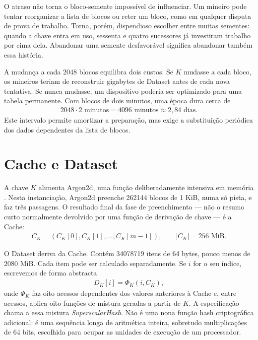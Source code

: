 O atraso não torna o bloco-semente impossível de influenciar. Um mineiro pode
tentar reorganizar a lista de blocos ou reter um bloco, como em qualquer disputa de
prova de trabalho. Torna, porém, dispendioso escolher entre muitas sementes:
quando a chave entra em uso, sessenta e quatro sucessores já investiram
trabalho por cima dela. Abandonar uma semente desfavorável significa abandonar
também essa história.

A mudança a cada 2048 blocos equilibra dois custos. Se \(K\) mudasse a cada
bloco, os mineiros teriam de reconstruir gigabytes de Dataset antes de cada
nova tentativa. Se nunca mudasse, um dispositivo poderia ser optimizado para
uma tabela permanente. Com blocos de dois minutos, uma época dura cerca de
\begin{align*}
 2048\cdot2\text{ minutos}=4096\text{ minutos}
 \approx 2{,}84\text{ dias}.
\end{align*}
Este intervalo permite amortizar a preparação, mas exige a substituição
periódica dos dados dependentes da lista de blocos.


\section{Cache e Dataset}
\label{sec:randomx-two-memories}

A chave \(K\) alimenta Argon2d, uma
função deliberadamente intensiva em memória \cite{argon2-paper}. Nesta
instanciação, Argon2d preenche 262144 blocos de 1 KiB, numa só pista, e faz
três passagens. O resultado final da fase de preenchimento --- não o resumo
curto normalmente devolvido por uma função de derivação de chave --- é a
Cache:
\begin{align}
 C_K=(C_K[0],C_K[1],\ldots,C_K[m-1]),\qquad |C_K|=256\text{ MiB}.
 \label{eq:randomx-cache}
\end{align}

O Dataset deriva da Cache. Contém 34078719 itens de 64 bytes, pouco menos
de 2080 MiB. Cada item pode ser calculado separadamente. Se \(i\) for o seu
índice, escrevemos de forma abstracta
\begin{align}
 D_K[i]=\Phi_K(i,C_K),
 \label{eq:randomx-dataset-item}
\end{align}
onde \(\Phi_K\) faz oito acessos dependentes dos valores anteriores à Cache e,
entre acessos, aplica oito funções de mistura geradas a partir de \(K\). A
especificação chama a essa mistura \emph{SuperscalarHash}. Não é uma nona
função hash criptográfica adicional: é uma sequência longa de
aritmética inteira, sobretudo multiplicações de 64 bits, escolhida para ocupar
as unidades de execução de um processador.


